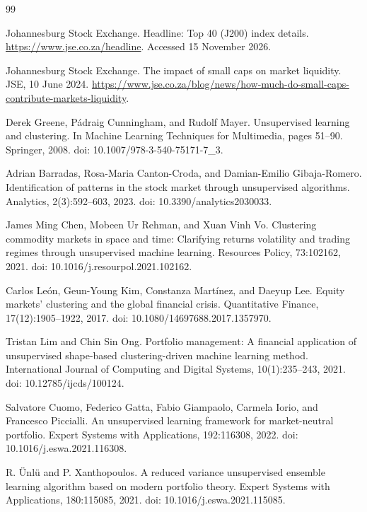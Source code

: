 \begin{thebibliography}{99}

 Johannesburg Stock Exchange. Headline: Top 40 (J200) index details. \url{https://www.jse.co.za/headline}. Accessed 15 November 2026.

 Johannesburg Stock Exchange. The impact of small caps on market liquidity. JSE, 10 June 2024. \url{https://www.jse.co.za/blog/news/how-much-do-small-caps-contribute-markets-liquidity}.

 Derek Greene, P\'{a}draig Cunningham, and Rudolf Mayer. Unsupervised learning and clustering. In Machine Learning Techniques for Multimedia, pages 51--90. Springer, 2008. doi: 10.1007/978-3-540-75171-7\_3.

 Adrian Barradas, Rosa-Maria Canton-Croda, and Damian-Emilio Gibaja-Romero. Identification of patterns in the stock market through unsupervised algorithms. Analytics, 2(3):592--603, 2023. doi: 10.3390/analytics2030033.

 James Ming Chen, Mobeen Ur Rehman, and Xuan Vinh Vo. Clustering commodity markets in space and time: Clarifying returns volatility and trading regimes through unsupervised machine learning. Resources Policy, 73:102162, 2021. doi: 10.1016/j.resourpol.2021.102162.

 Carlos Le\'{o}n, Geun-Young Kim, Constanza Mart\'{i}nez, and Daeyup Lee. Equity markets' clustering and the global financial crisis. Quantitative Finance, 17(12):1905--1922, 2017. doi: 10.1080/14697688.2017.1357970.

 Tristan Lim and Chin Sin Ong. Portfolio management: A financial application of unsupervised shape-based clustering-driven machine learning method. International Journal of Computing and Digital Systems, 10(1):235--243, 2021. doi: 10.12785/ijcds/100124.

 Salvatore Cuomo, Federico Gatta, Fabio Giampaolo, Carmela Iorio, and Francesco Piccialli. An unsupervised learning framework for market-neutral portfolio. Expert Systems with Applications, 192:116308, 2022. doi: 10.1016/j.eswa.2021.116308.

 R. \"{U}nl\"{u} and P. Xanthopoulos. A reduced variance unsupervised ensemble learning algorithm based on modern portfolio theory. Expert Systems with Applications, 180:115085, 2021. doi: 10.1016/j.eswa.2021.115085.


\end{thebibliography}
